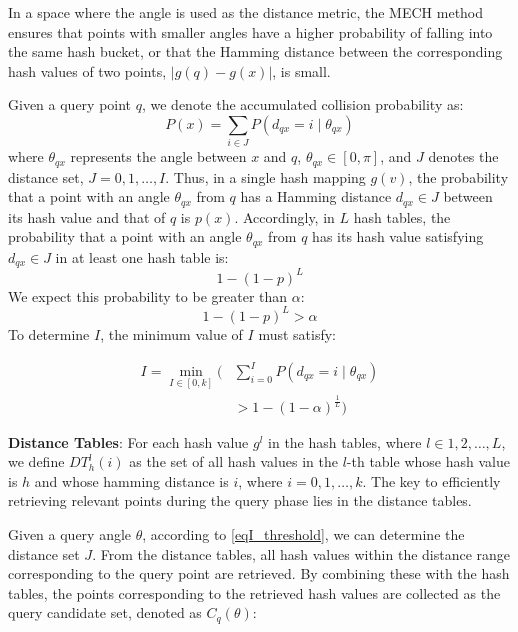 \documentclass[conference]{IEEEtran}
\begin{document}
In a space where the angle is used as the distance metric, the MECH method ensures that points with smaller angles have a higher probability of falling into the same hash bucket, or that the Hamming distance between the corresponding hash values of two points, $|g(q) - g(x)|$, is small.


Given a query point $q$, we denote the accumulated collision probability as:
\begin{equation*}
P(x) = \sum_{i \in{J}} P(d_{qx} = i \mid \theta_{qx})
\end{equation*}
where $\theta_{qx}$ represents the angle between $x$ and $q$, $\theta_{qx} \in [0,\pi]$, and ${J}$ denotes the distance set, ${J} = {0,1,\ldots,I}$.
Thus, in a single hash mapping $g(v)$, the probability that a point with an angle $\theta_{qx}$ from $q$ has a Hamming distance $d_{qx} \in {J}$ between its hash value and that of $q$ is $p(x)$.
Accordingly, in $L$ hash tables, the probability that a point with an angle $\theta_{qx}$ from $q$ has its hash value satisfying $d_{qx} \in {J}$ in at least one hash table is:
\[
1 - (1 - p)^L
\]  
We expect this probability to be greater than $\alpha$:
\[
1 - (1 - p)^L > \alpha
\]  
To determine $I$, the minimum value of $I$ must satisfy:

\begin{equation}
\begin{aligned}
I = \min_{I \in [0,k]} \Bigg(
    &\sum_{i=0}^I P(d_{qx} = i \mid \theta_{qx}) \\
    &> 1 - (1 - \alpha)^{\tfrac{1}{L}}
\Bigg)
\end{aligned}
\label{eqI_threshold}
\end{equation}



\textbf{Distance Tables}: 
For each hash value $g^l$ in the hash tables, where $l \in {1,2,\ldots,L}$, we define $DT_h^l(i)$ as the set of all hash values in the $l$-th table whose hash value is $h$ and whose hamming distance is $i$, where $i = 0, 1, \ldots, k$.
The key to efficiently retrieving relevant points during the query phase lies in the distance tables.

Given a query angle $\theta$, according to \eqref{eqI_threshold}, we can determine the distance set $J$.
From the distance tables, all hash values within the distance range corresponding to the query point are retrieved.
By combining these with the hash tables, the points corresponding to the retrieved hash values are collected as the query candidate set, denoted as $C_q(\theta)$:
\end{document}
